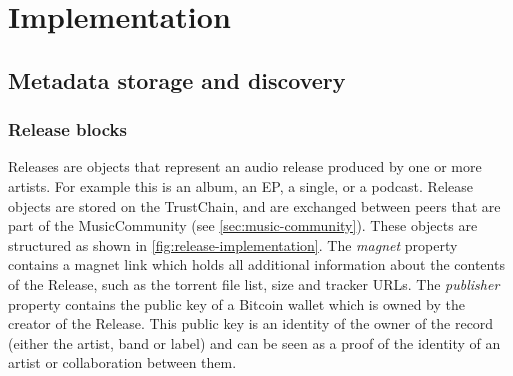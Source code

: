 \chapter{Implementation}
\section{}
\section{Metadata storage and discovery}
\subsection{Release blocks}
Releases are objects that represent an audio release produced by one or more artists. For example this is an album, an EP, a single, or a podcast. Release objects are stored on the TrustChain, and are exchanged between peers that are part of the MusicCommunity (see \ref{sec:music-community}). These objects are structured as shown in \ref{fig:release-implementation}. The \textit{magnet} property contains a magnet link which holds all additional information about the contents of the Release, such as the torrent file list, size and tracker URLs. The \textit{publisher} property contains the public key of a Bitcoin wallet which is owned by the creator of the Release. This public key is an identity of the owner of the record (either the artist, band or label) and can be seen as a proof of the identity of an artist or collaboration between them. 

